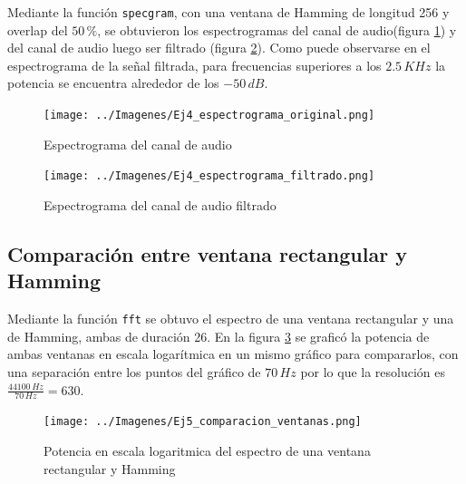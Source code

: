 \documentclass[10pt,spanish,a4paper,openany,notitlepage]{article}
\begin{document}
Mediante la función \texttt{specgram}, con una ventana de Hamming de longitud
256 y overlap del $50\, \unit{\%}$, se obtuvieron los espectrogramas
del canal de audio(figura \ref{fig:espectrograma_original}) y del
canal de audio luego ser filtrado (figura \ref{fig:espectrograma_filtrado}).
Como puede observarse en el espectrograma de la señal filtrada, para
frecuencias superiores a los $2.5\, \unit{KHz}$ la potencia se encuentra
alrededor de los $-50\, \unit{dB}$.


\begin{figure}[H] %
\begin{center}
\texttt{[image: ../Imagenes/Ej4\_espectrograma\_original.png]}
\caption{Espectrograma del canal de audio}
 \label{fig:espectrograma_original}
\end{center}
\end{figure}

\begin{figure}[H] %
\begin{center}
\texttt{[image: ../Imagenes/Ej4\_espectrograma\_filtrado.png]}
\caption{Espectrograma del canal de audio filtrado}
 \label{fig:espectrograma_filtrado}
\end{center}
\end{figure}

\subsection{Comparación entre ventana rectangular y Hamming}

Mediante la función \texttt{fft} se obtuvo el espectro de una
ventana rectangular y una de Hamming, ambas de duración 26.
En la figura \ref{fig:rec_vs_hamm} se graficó la potencia de ambas ventanas
en escala logarítmica en un mismo gráfico para compararlos, con una
separación entre los puntos del gráfico de $70\, \unit{Hz}$ por lo que
la resolución es $\frac{44100\,\unit{Hz}}{70\,\unit{Hz}} = 630$.

\begin{figure}[H] %
\begin{center}
\texttt{[image: ../Imagenes/Ej5\_comparacion\_ventanas.png]}
\caption{Potencia en escala logaritmica del espectro de una ventana rectangular y Hamming}
 \label{fig:rec_vs_hamm}
\end{center}
\end{figure}
\end{document}

